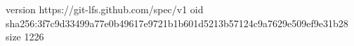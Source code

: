 version https://git-lfs.github.com/spec/v1
oid sha256:3f7c9d33499a77e0b49617e9721b1b601d5213b57124c9a7629e509ef9e31b28
size 1226
